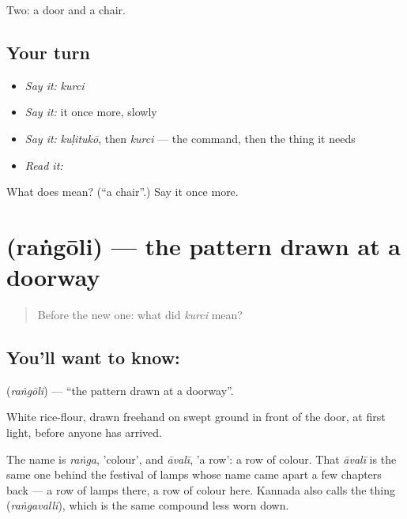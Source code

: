 \begin{grammarlens}[title={What you've built}]
Two: a door and a chair.
\end{grammarlens}

\subsection*{Your turn}
\begin{itemize}
\raggedright
  \item \emph{Say it:} \emph{kurci}
  \item \emph{Say it:} it once more, slowly
  \item \emph{Say it:} \emph{kuḷitukō}, then \emph{kurci} — the command, then the thing it needs
  \item \emph{Read it:} \textbf{}
\end{itemize}

\begin{tcolorbox}[breakable,colback=teal!4,colframe=teal!35!black,title={Before you move on}]
What does  mean? (\textquotedblleft{}a chair\textquotedblright{}.) Say it once more.
\end{tcolorbox}
\section[\texorpdfstring{\kn{ರಂಗೋಲಿ} (raṅgōli)}{ರಂಗೋಲಿ (raṅgōli)}]{ (raṅgōli) — the pattern drawn at a doorway}

\label{lesson:KA-C52-rangoli}



\begin{quote}
Before the new one: what did \emph{kurci} mean?
\end{quote}

\subsection*{You'll want to know: }
\textbf{} (\emph{raṅgōli}) — \textquotedblleft{}the pattern drawn at a doorway\textquotedblright{}.

White rice-flour, drawn freehand on swept ground in front of the door, at first light, before anyone has arrived.

The name is \emph{raṅga}, 'colour', and \emph{āvalī}, 'a row': a row of colour. That \emph{āvalī} is the same one behind the festival of lamps whose name came apart a few chapters back — a row of lamps there, a row of colour here. Kannada also calls the thing  (\emph{raṅgavalli}), which is the same compound less worn down.

